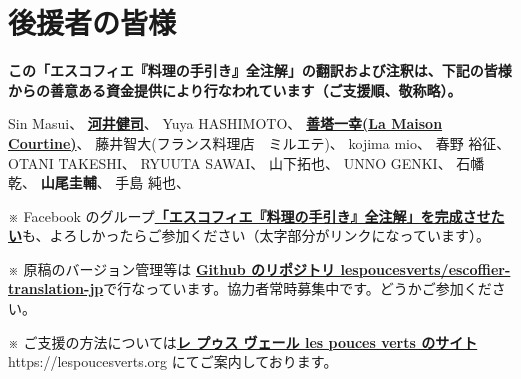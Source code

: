 \hypertarget{benefactors}{%
\section{後援者の皆様}\label{benefactors}}

\thispagestyle{empty}

\small

\textbf{この「エスコフィエ『料理の手引き』全注解」の翻訳および注釈は、下記の皆様からの善意ある資金提供により行なわれています（ご支援順、敬称略）。}

\normalsize
\vspace{1\zw}

Sin Masui、\href{20180524-23h,2x,novelsoundsmail@gmail.com}{}
\href{http://www.undecesjours.com/}{\textbf{河井健司}}、\href{20180525-0h14,10x,20180605-11h42,10x,kwibeng@gmail.com}{}
Yuya HASHIMOTO、\href{20180525-1h40,2x,hashimo0910@gmail.com}{}
\href{http://www.courtine.jp/}{\textbf{善塔一幸(La Maison
Courtine)}}、\href{20180525-8h56,10x,kazuyukizento120@docomo.ne.jp}{}
藤井智大(フランス料理店　ミルエテ)、\href{20180525-10h07,1x,apple19761019@yahoo.co.jp}{}
kojima mio、\href{20180525-12h23,1x,teeeeshow@yahoo.co.jp}{} 春野
裕征、\href{20180528-2h41,20180617,2x,amanojack.v-o-v@i.softbank.jp}{}
OTANI TAKESHI、\href{20180529-17h26,2x,1000feuille@ezweb.ne.jp}{} RYUUTA
SAWAI、\href{20180530-2h57.1x,rs.ajtk.zz@i.softbank.jp}{}
山下拓也、\href{20180605-11h04,5x,FB:Takuya\%20Yamashita}{} UNNO
GENKI、\href{20180605-22h12,1x,guriiva@aol.com}{}
石幡乾、\href{201806060-6h24,1x,zonek.gentile.bonheur.ken05@gmail.com}{}
\textbf{山尾圭輔}、\href{20180612-10h27,20x,yamaokeisuke@hotmail.com}{}
手島 純也、\href{20180612-19h19,1x,junchef1975@yahoo.co.jp}{}

\vfill

\small

※ Facebook
のグループ\href{https://www.facebook.com/groups/1548833425201180/}{\textbf{「エスコフィエ『料理の手引き』全注解」を完成させたい}}も、よろしかったらご参加ください（太字部分がリンクになっています）。

※ 原稿のバージョン管理等は
\href{https://github.com/lespoucesverts/escoffier-translation-jp}{\textbf{Github
のリポジトリ
lespoucesverts/escoffier-translation-jp}}で行なっています。協力者常時募集中です。どうかご参加ください。

※
ご支援の方法については\href{https://lespoucesverts.org/archives/7042}{\textbf{レ
プゥス ヴェール les pouces verts のサイト}} https://lespoucesverts.org
にてご案内しております。

\normalsize
